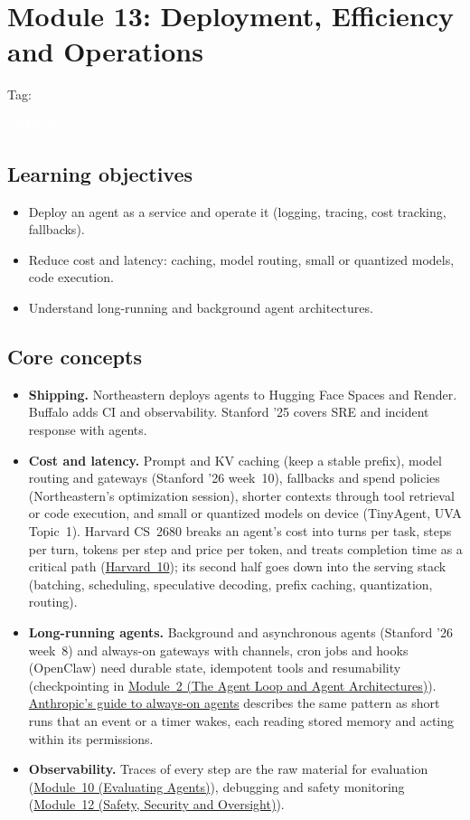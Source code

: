 \documentclass[10pt,oneside]{report}
\newcommand{\tg}[1]{{\setlength{\fboxsep}{1.2pt}\colorbox{tag#1}{\kern1pt\textcolor{white}{\sffamily\bfseries\fontsize{5.5}{6}\selectfont\strut #1}\kern1.5pt}}}
\begin{document}
\chapter{Module 13: Deployment, Efficiency and Operations}\hypertarget{mod-DEPLOY}{}
{\small Tag: \tg{DEPLOY}}
\section{Learning objectives}
\begin{itemize}
\item Deploy an agent as a service and operate it (logging, tracing, cost tracking, fallbacks).
\item Reduce cost and latency: caching, model routing, small or quantized models, code execution.
\item Understand long-running and background agent architectures.
\end{itemize}
\section{Core concepts}
\begin{itemize}
\item \textbf{Shipping.} Northeastern deploys agents to Hugging Face Spaces and Render. Buffalo adds CI and observability. Stanford '25 covers SRE and incident response with agents.
\item \textbf{Cost and latency.} Prompt and KV caching (keep a stable prefix), model routing and gateways (Stanford '26 week~10), fallbacks and spend policies (Northeastern's optimization session), shorter contexts through tool retrieval or code execution, and small or quantized models on device (TinyAgent, UVA Topic~1). Harvard CS~2680 breaks an agent's cost into turns per task, steps per turn, tokens per step and price per token, and treats completion time as a critical path (\hyperlink{lec-HARV-10}{Harvard~10}); its second half goes down into the serving stack (batching, scheduling, speculative decoding, prefix caching, quantization, routing).
\item \textbf{Long-running agents.} Background and asynchronous agents (Stanford '26 week~8) and always-on gateways with channels, cron jobs and hooks (OpenClaw) need durable state, idempotent tools and resumability (checkpointing in \hyperlink{mod-ARCH}{Module~2 (The Agent Loop and Agent Architectures)}). \hyperref[sup-alwayson]{Anthropic's guide to always-on agents} describes the same pattern as short runs that an event or a timer wakes, each reading stored memory and acting within its permissions.
\item \textbf{Observability.} Traces of every step are the raw material for evaluation (\hyperlink{mod-EVAL}{Module~10 (Evaluating Agents)}), debugging and safety monitoring (\hyperlink{mod-SAFE}{Module~12 (Safety, Security and Oversight)}).
\end{itemize}
\end{document}
